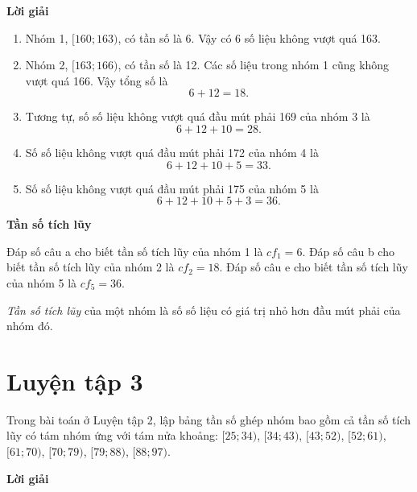 \documentclass[
  letterpaper,
  DIV=11,
  numbers=noendperiod]{scrartcl}
\providecommand{\tightlist}{%
  \setlength{\itemsep}{0pt}\setlength{\parskip}{0pt}}\usepackage{longtable,booktabs,array}
\begin{document}
\begin{center}
\textbf{Lời giải}
\end{center}

\begin{enumerate}
\def\labelenumi{\alph{enumi}.}
\tightlist
\item
  Nhóm 1, \([160; 163)\), có tần số là 6. Vậy có 6 số liệu không vượt
  quá 163.
\item
  Nhóm 2, \([163; 166)\), có tần số là 12. Các số liệu trong nhóm 1 cũng
  không vượt quá 166. Vậy tổng số là \[
  6+12=18.
  \]
\item
  Tương tự, số số liệu không vượt quá đầu mút phải 169 của nhóm 3 là \[
  6+12+10=28.
  \]
\item
  Số số liệu không vượt quá đầu mút phải 172 của nhóm 4 là \[
  6+12+10+5=33.
  \]
\item
  Số số liệu không vượt quá đầu mút phải 175 của nhóm 5 là \[
  6+12+10+5+3=36.
  \]
\end{enumerate}

\begin{tcolorbox}[enhanced jigsaw, opacityback=0, breakable, colback=white, left=2mm, rightrule=.15mm, leftrule=.75mm, arc=.35mm, colframe=quarto-callout-note-color-frame, bottomrule=.15mm, toprule=.15mm]

\vspace{-3mm}\textbf{Tần số tích lũy}\vspace{3mm}

Đáp số câu a cho biết tần số tích lũy của nhóm 1 là \(cf_1=6\). Đáp số
câu b cho biết tần số tích lũy của nhóm 2 là \(cf_2=18\). Đáp số câu e
cho biết tần số tích lũy của nhóm 5 là \(cf_5=36\).

\emph{Tần số tích lũy} của một nhóm là số số liệu có giá trị nhỏ hơn đầu
mút phải của nhóm đó.

\end{tcolorbox}

\section*{Luyện tập 3}

Trong bài toán ở Luyện tập 2, lập bảng tần số ghép nhóm bao gồm cả tần
số tích lũy có tám nhóm ứng với tám nửa khoång: \([25; 34)\),
\([34; 43)\), \([43; 52)\), \([52; 61)\), \([61; 70)\), \([70; 79)\),
\([79 ; 88)\), \([88; 97)\).

\begin{center}
\textbf{Lời giải}
\end{center}
\end{document}
